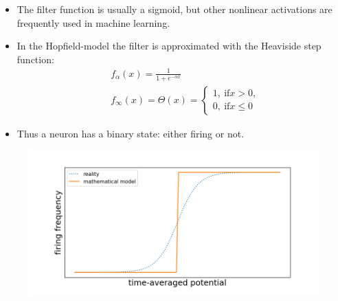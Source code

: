 \documentclass[12pt]{article}
\numberwithin{equation}{section}
\begin{document}
\newpage
\begin{itemize}
    \item The filter function is usually a sigmoid, but other nonlinear activations are frequently used in machine learning.
    \item In the Hopfield-model the filter is approximated with the Heaviside step function:
    \begin{align*}
        &f_{\alpha}(x) = \frac{1}{1+e^{-\alpha x}}\\
        &f_{\infty}(x) = \Theta(x) = \begin{cases}
            1, ~\textrm{if} x > 0, \\
            0, ~\textrm{if} x \leq 0
        \end{cases}
    \end{align*}
    \item Thus a neuron has a binary state: either firing or not.
\end{itemize}
\begin{figure}[h!]
    \centering
    \includegraphics[height=0.5\textheight]{images/sigmoid-model.png}
\end{figure}

\newpage
\end{document}
